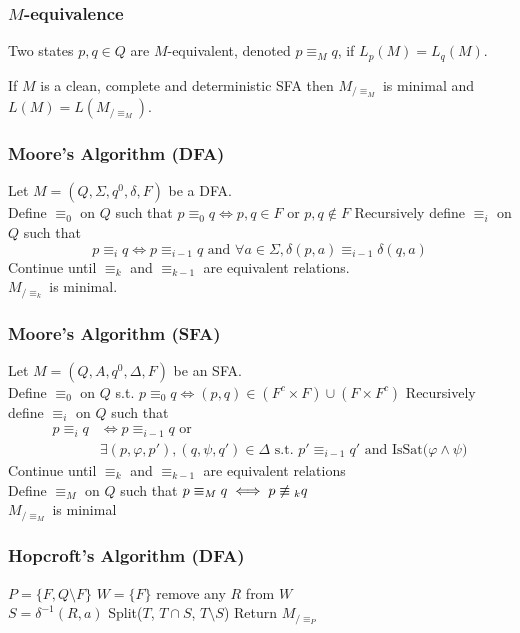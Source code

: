 \documentclass[12pt]{beamer}
\begin{document}
\begin{frame}
\frametitle{$M$-equivalence}
\begin{definition}
Two states $p,q \in Q$ are \alert{$M$-equivalent}, denoted $p \equiv_M q$, if $L_p(M) = L_q(M)$.
\end{definition}

\begin{theorem}
If $M$ is a clean, complete and deterministic SFA then $M_{/\equiv_M}$ is minimal and $L(M) = L(M_{/\equiv_M})$.
\end{theorem}
\end{frame}

\begin{frame}
\frametitle{Moore's Algorithm (DFA)}
Let $M = (Q, \Sigma, q^0, \delta, F)$ be a DFA.\\
Define $\equiv_0$ on $Q$ such that $p \equiv_0 q \iff p,q \in F$ or $p,q \not\in F$
Recursively define $\equiv_i$ on $Q$ such that
$$p \equiv_i q \iff p \equiv_{i-1} q \text{ and } \forall a \in \Sigma, \delta(p,a) \equiv_{i-1} \delta(q,a)$$
Continue until $\equiv_k$ and $\equiv_{k-1}$ are equivalent relations.\\
$M_{/\equiv_k}$ is minimal.
\end{frame}

\begin{frame}
\frametitle{Moore's Algorithm (SFA)}
Let $M = (Q, A, q^0, \Delta, F)$ be an SFA.\\
Define $\equiv_0$ on $Q$ s.t. $p \equiv_0 q \iff (p,q) \in (F^c \times F) \cup (F \times F^c)$
Recursively define $\equiv_i$ on $Q$ such that
\begin{align*}
p \equiv_{i} q &\iff p \equiv_{i-1} q \text{ or } \\
&\exists (p,\varphi,p'), (q, \psi, q') \in \Delta \text{ s.t. } p' \equiv_{i-1} q' \text{ and IsSat($\varphi \wedge \psi$)}
\end{align*}
Continue until $\equiv_k$ and $\equiv_{k-1}$ are equivalent relations\\
Define $\equiv_M$ on $Q$ such that $p \equiv_M q \iff p \centernot\equiv_k q$\\
$M_{/\equiv_M}$ is minimal
\end{frame}

\begin{frame}
\frametitle{Hopcroft's Algorithm (DFA)}
\begin{algorithm}[H]
$P = \{ F, Q \setminus F \}$ 
$W = \{F\} $ 
{
	remove any $R$ from $W$\\
	{
		$S = \delta^{-1} (R, a)$ 
		{
			{
				Split($T$, $T \cap S$, $T \setminus S$) 
			}
		}
	}
}
Return $M_{/\equiv_P}$
\end{algorithm}

\end{frame}
\end{document}

